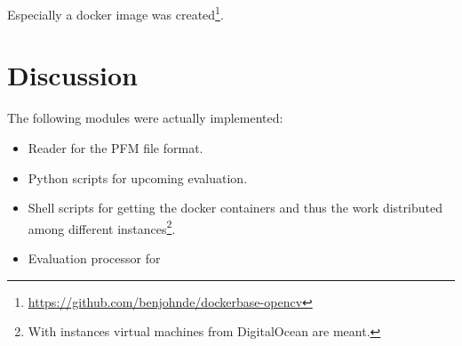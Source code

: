 \noindent Especially a docker image was created\footnote{\url{https://github.com/benjohnde/dockerbase-opencv}}.

\section{Discussion}

The following modules were actually implemented:

\begin{itemize}
  \item Reader for the PFM file format.
  \item Python scripts for upcoming evaluation.
  \item Shell scripts for getting the docker containers and thus the work distributed among different instances\footnote{With instances virtual machines from DigitalOcean are meant.}.
  \item Evaluation processor for
\end{itemize}


